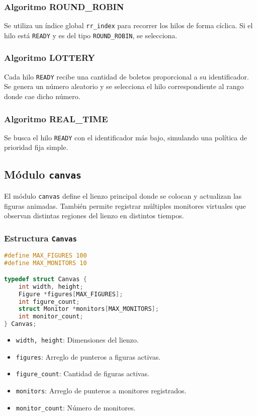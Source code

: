 \documentclass[12pt]{article}
\begin{document}
\subsubsection*{Algoritmo ROUND\_ROBIN}

Se utiliza un índice global \texttt{rr\_index} para recorrer los hilos de forma cíclica. Si el hilo está \texttt{READY} y es del tipo \texttt{ROUND\_ROBIN}, se selecciona.

\subsubsection*{Algoritmo LOTTERY}

Cada hilo \texttt{READY} recibe una cantidad de boletos proporcional a su identificador. Se genera un número aleatorio y se selecciona el hilo correspondiente al rango donde cae dicho número.

\subsubsection*{Algoritmo REAL\_TIME}

Se busca el hilo \texttt{READY} con el identificador más bajo, simulando una política de prioridad fija simple.




\subsection{Módulo \texttt{canvas}}

El módulo \texttt{canvas} define el lienzo principal donde se colocan y actualizan las figuras animadas. También permite registrar múltiples monitores virtuales que observan distintas regiones del lienzo en distintos tiempos.

\subsubsection*{Estructura \texttt{Canvas}}

\begin{lstlisting}[language=C]
#define MAX_FIGURES 100
#define MAX_MONITORS 10

typedef struct Canvas {
    int width, height;
    Figure *figures[MAX_FIGURES];
    int figure_count;
    struct Monitor *monitors[MAX_MONITORS]; 
    int monitor_count;
} Canvas;
\end{lstlisting}

\begin{itemize}
    \item \texttt{width, height}: Dimensiones del lienzo.
    \item \texttt{figures}: Arreglo de punteros a figuras activas.
    \item \texttt{figure\_count}: Cantidad de figuras activas.
    \item \texttt{monitors}: Arreglo de punteros a monitores registrados.
    \item \texttt{monitor\_count}: Número de monitores.
\end{itemize}
\end{document}
